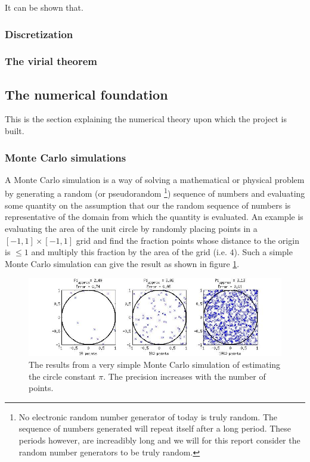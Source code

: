 It can be shown \cite{master} that. 
















\subsubsection{Discretization}

\subsubsection{The virial theorem}


\subsection{The numerical foundation}
This is the section explaining the numerical theory upon which the project is built. 

\subsubsection{Monte Carlo simulations}
A Monte Carlo simulation is a way of solving a mathematical or physical problem by generating a random
(or pseudorandom
\footnote
{No electronic random number generator of today is truly random. 
The sequence of numbers generated will repeat itself after a long period. 
These periods however, are increadibly long and we will for this report 
consider the random number generators to be truly random.})
sequence of numbers and evaluating some quantity on the assumption that our the random sequence of numbers is representative of the domain from which the quantity is evaluated.
An example is evaluating the area of the unit circle by randomly placing points in a $[-1,1] \times [-1,1] $ grid and find the fraction points whose distance to the origin is $\leq 1$ and multiply this fraction by the area of the grid (i.e. $4$).
Such a simple Monte Carlo simulation can give the result as shown in figure \ref{fig:Monte_Carlo_Illustration}.

\begin{figure}[h!]
        \centering 
        \includegraphics[width=\textwidth]{Monte_Carlo_Illustration.jpg}
        \caption{The results from a very simple Monte Carlo simulation of 
        estimating the circle constant $\pi$. 
        The precision increases with the number of points.}
        \label{fig:Monte_Carlo_Illustration}
\end{figure}

